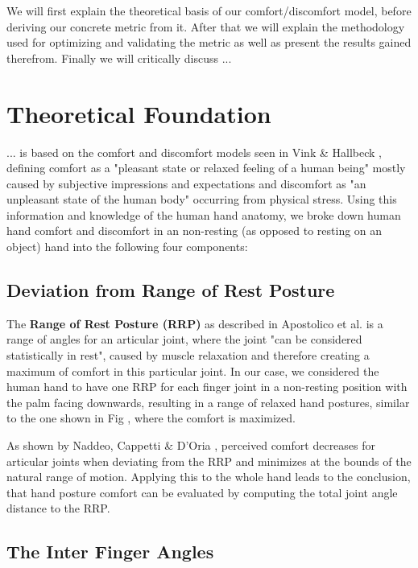 \documentclass{sig-alternate-05-2015}
\begin{document}
We will first explain the theoretical basis of our comfort/discomfort model, before deriving our concrete metric from it. After that we will explain the methodology used for optimizing and validating the metric as well as present the results gained therefrom. Finally we will critically discuss ...


\section{Theoretical Foundation}
... is based on the comfort and discomfort models seen in Vink \& Hallbeck \cite{vink2012editorial}, defining comfort as a "pleasant state or relaxed feeling of a human being" mostly caused by subjective impressions and expectations and discomfort as "an unpleasant state of the human body" occurring from physical stress. Using this information and knowledge of the human hand anatomy, we broke down human hand comfort and discomfort in an non-resting (as opposed to resting on an object) hand into the following four components:

\subsection{Deviation from Range of Rest Posture}

The \textbf{Range of Rest Posture (RRP)} as described in Apostolico et al. \cite{apostolico2014postural} is a range of angles for an articular joint, where the joint "can be considered statistically in rest", caused by muscle relaxation and therefore creating a maximum of comfort in this particular joint. In our case, we considered the human hand to have one RRP for each finger joint in a non-resting position with the palm facing downwards, resulting in a range of relaxed hand postures, similar to the one shown in Fig
, where the comfort is maximized. 

As shown by Naddeo, Cappetti \& D'Oria 
\cite{naddeo2015proposal}, perceived comfort decreases for articular joints when deviating from the RRP and minimizes at the bounds of the natural range of motion. Applying this to the whole hand leads to the conclusion, that hand posture comfort can be evaluated by computing the total joint angle distance to the RRP.

\subsection{The Inter Finger Angles}
\end{document}
